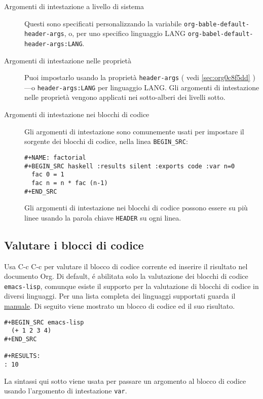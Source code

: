 \documentclass[11pt]{article}
\begin{document}
\begin{description}
\item[{Argomenti di intestazione a livello di sistema}] Questi sono specificati personalizzando la variabile
\texttt{org-bable-default-header-args}, o, per uno specifico linguaggio
LANG \texttt{org-babel-default-header-args:LANG}.

\item[{Argomenti di intestazione nelle proprietà}] Puoi impostarlo usando la proprietà \texttt{header-args} ( vedi \ref{sec:org0c8f5dd}
)---o \texttt{header-args:LANG} per linguaggio LANG. Gli
argomenti di intestazione nelle proprietà vengono applicati nei
sotto-alberi dei livelli sotto.

\item[{Argomenti di intestazione nei blocchi di codice}] Gli argomenti di intestazione sono comunemente usati per impostare
il sorgente dei blocchi di codice, nella linea \texttt{BEGIN\_SRC}:

\begin{verbatim}
#+NAME: factorial
#+BEGIN_SRC haskell :results silent :exports code :var n=0
  fac 0 = 1
  fac n = n * fac (n-1)
#+END_SRC
\end{verbatim}

Gli argomenti di intestazione nei blocchi di codice possono essere
su più linee usando la parola chiave \texttt{HEADER} su ogni linea.
\end{description}

\subsection*{Valutare i blocci di codice}
\label{sec:org8cd1959}
Usa C-c C-c per valutare il blocco di codice corrente ed
inserire il risultato nel documento Org. Di default, é abilitata solo
la valutazione dei blocchi di codice \texttt{emacs-lisp}, comunque esiste il
supporto per la valutazione di blocchi di codice in diversi
linguaggi. Per una lista completa dei linguaggi supportati guarda il
\href{manual}{manuale}. Di seguito viene mostrato un blocco di codice ed il suo
risultato.

\begin{verbatim}
#+BEGIN_SRC emacs-lisp
  (+ 1 2 3 4)
#+END_SRC

#+RESULTS:
: 10
\end{verbatim}

La sintassi qui sotto viene usata per passare un argomento al blocco
di codice usando l'argomento di intestazione \texttt{var}.
\end{document}
